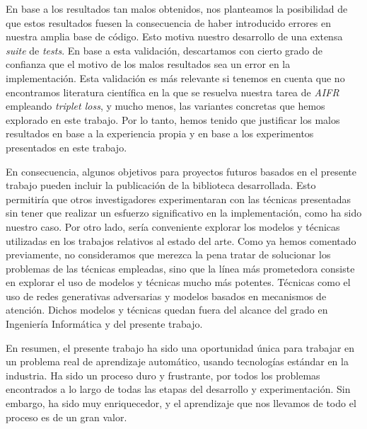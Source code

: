 En base a los resultados tan malos obtenidos, nos planteamos la posibilidad de que estos resultados fuesen la consecuencia de haber introducido errores en nuestra amplia base de código. Esto motiva nuestro desarrollo de una extensa \textit{suite} de \textit{tests}. En base a esta validación, descartamos con cierto grado de confianza que el motivo de los malos resultados sea un error en la implementación. Esta validación es más relevante si tenemos en cuenta que no encontramos literatura científica en la que se resuelva nuestra tarea de \textit{AIFR} empleando \textit{triplet loss}, y mucho menos, las variantes concretas que hemos explorado en este trabajo. Por lo tanto, hemos tenido que justificar los malos resultados en base a la experiencia propia y en base a los experimentos presentados en este trabajo.

En consecuencia, algunos objetivos para proyectos futuros basados en el presente trabajo pueden incluir la publicación de la biblioteca desarrollada. Esto permitiría que otros investigadores experimentaran con las técnicas presentadas sin tener que realizar un esfuerzo significativo en la implementación, como ha sido nuestro caso. Por otro lado, sería conveniente explorar los modelos y técnicas utilizadas en los trabajos relativos al estado del arte. Como ya hemos comentado previamente, no consideramos que merezca la pena tratar de solucionar los problemas de las técnicas empleadas, sino que la línea más prometedora consiste en explorar el uso de modelos y técnicas mucho más potentes. Técnicas como el uso de redes generativas adversarias y modelos basados en mecanismos de atención. Dichos modelos y técnicas quedan fuera del alcance del grado en Ingeniería Informática y del presente trabajo.

En resumen, el presente trabajo ha sido una oportunidad única para trabajar en un problema real de aprendizaje automático, usando tecnologías estándar en la industria. Ha sido un proceso duro y frustrante, por todos los problemas encontrados a lo largo de todas las etapas del desarrollo y experimentación. Sin embargo, ha sido muy enriquecedor, y el aprendizaje que nos llevamos de todo el proceso es de un gran valor.

